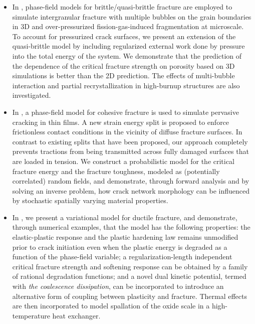 \begin{itemize}
  \item %
        In , phase-field models for brittle/quasi-brittle fracture are employed to simulate intergranular fracture with multiple bubbles on the grain boundaries in 3D and over-pressurized fission-gas-induced fragmentation at microscale. To account for pressurized crack surfaces, we present an extension of the quasi-brittle model by including regularized external work done by pressure into the total energy of the system. We demonstrate that the prediction of the dependence of the critical fracture strength on porosity based on 3D simulations is better than the 2D prediction. The effects of multi-bubble interaction and partial recrystallization in high-burnup structures are also investigated.
  \item %
        In , a phase-field model for cohesive fracture is used to simulate pervasive cracking in thin films. A new strain energy split is proposed to enforce frictionless contact conditions in the vicinity of diffuse fracture surfaces. In contrast to existing splits that have been proposed, our approach completely prevents tractions from being transmitted across fully damaged surfaces that are loaded in tension. We construct a probabilistic model for the critical fracture energy and the fracture toughness, modeled as (potentially correlated) random fields, and demonstrate, through forward analysis and by solving an inverse problem, how crack network morphology can be influenced by stochastic spatially varying material properties.
  \item %
        In , we present a variational model for ductile fracture, and demonstrate, through numerical examples, that the model has the following properties: the elastic-plastic response and the plastic hardening law remains unmodified prior to crack initiation even when the plastic energy is degraded as a function of the phase-field variable; a regularization-length independent critical fracture strength and softening response can be obtained by a family of rational degradation functions; and a novel dual kinetic potential, termed with \emph{the coalescence dissipation}, can be incorporated to introduce an alternative form of coupling between plasticity and fracture. Thermal effects are then incorporated to model spallation of the oxide scale in a high-temperature heat exchanger.
\end{itemize}
